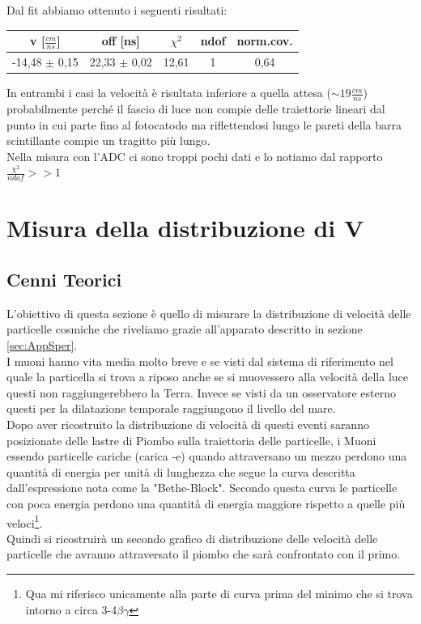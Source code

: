 \documentclass[a4paper]{article}
\begin{document}
Dal fit abbiamo ottenuto i seguenti risultati:

\begin{tabular}{|c|c|c|c|c|}
\hline
v [$\frac{cm}{ns}$] & off [ns] & $\chi ^2$ & ndof & norm.cov.  \\
\hline
-14,48 $\pm$ 0,15 & 22,33 $\pm$ 0,02 & 12,61 & 1 & 0,64\\
\hline
\end{tabular}

In entrambi i casi la velocità è risultata inferiore a quella attesa ($\sim 19\frac{cm}{ns}$) probabilmente perché il fascio di luce non compie delle traiettorie lineari dal punto in cui parte fino al fotocatodo ma riflettendosi lungo le pareti della barra scintillante compie un tragitto più lungo.\\
Nella misura con l'ADC ci sono troppi pochi dati e lo notiamo dal rapporto $\frac{\chi^2}{ndof}>>1$ 

\newpage
\section{Misura della distribuzione di V}
\label{sec:MisuraVMu}
\subsection{Cenni Teorici}
L'obiettivo di questa sezione è quello di misurare la distribuzione di velocità delle particelle cosmiche che riveliamo grazie all'apparato descritto in sezione \ref{sec:AppSper}.\\
I muoni hanno vita media molto breve e se visti dal sistema di riferimento nel quale la particella si trova a riposo anche se si muovessero alla velocità della luce questi non raggiungerebbero la Terra. Invece se visti da un osservatore esterno questi per la dilatazione temporale raggiungono il livello del mare.\\
Dopo aver ricostruito la distribuzione di velocità di questi eventi saranno posizionate delle lastre di Piombo sulla traiettoria delle particelle, i Muoni essendo particelle cariche (carica -e) quando attraversano un mezzo perdono una quantità di energia per unità di lunghezza che segue la curva descritta dall'espressione nota come la "Bethe-Block". Secondo questa curva le particelle con poca energia perdono una quantità di energia maggiore rispetto a quelle più veloci\footnote{Qua mi riferisco unicamente alla parte di curva prima del minimo che si trova intorno a circa 3-4$\beta \gamma$}.\\
Quindi si ricostruirà un secondo grafico di distribuzione delle velocità delle particelle che avranno attraversato il piombo che sarà confrontato con il primo.
\end{document}
